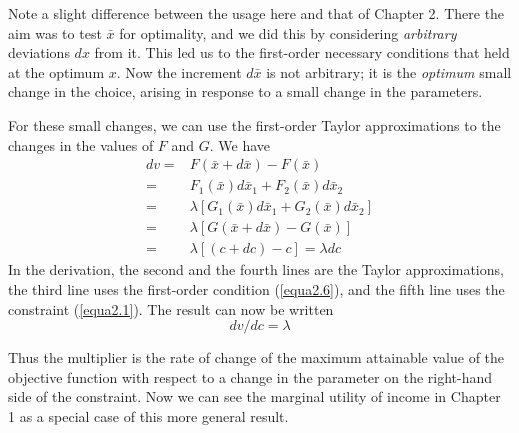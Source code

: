Note a slight difference between the usage here and that of Chapter 2. There the aim was to test $\bar{x}$ for optimality, and we did this by considering \textit{arbitrary} deviations $dx$ from it. This led us to the first-order necessary conditions that held at the optimum $x$. Now the increment $d\bar{x}$ is not arbitrary; it is the \textit{optimum} small change in the choice, arising in response to a small change in the parameters.

For these small changes, we can use the first-order Taylor approximations to the changes in the values of $F$ and $G$. We have
\begin{equation*}
\begin{array}{rl}
dv = & F(\bar{x} + d\bar{x} ) - F(\bar{x}) \\
   = & F_1(\bar{x}) d\bar{x}_1 + F_2(\bar{x}) d\bar{x}_2 \\
   = & \lambda [ G_1(\bar{x}) d\bar{x}_1 + G_2(\bar{x}) d\bar{x}_2 ] \\
   = & \lambda [ G(\bar{x} + d\bar{x} ) - G(\bar{x}) ] \\
   = & \lambda [(c+dc)-c] = \lambda dc
\end{array}
\end{equation*}
In the derivation, the second and the fourth lines are the Taylor approximations, the third line uses the first-order condition (\ref{equa2.6}), and the fifth line uses the constraint (\ref{equa2.1}). The result can now be written
\begin{equation} \label{equa4.1}
dv / dc = \lambda
\end{equation}

Thus the multiplier is the rate of change of the maximum attainable value of the objective function with respect to a change in the parameter on the right-hand side of the constraint. Now we can see the marginal utility of income in Chapter 1 as a special case of this more general result.

